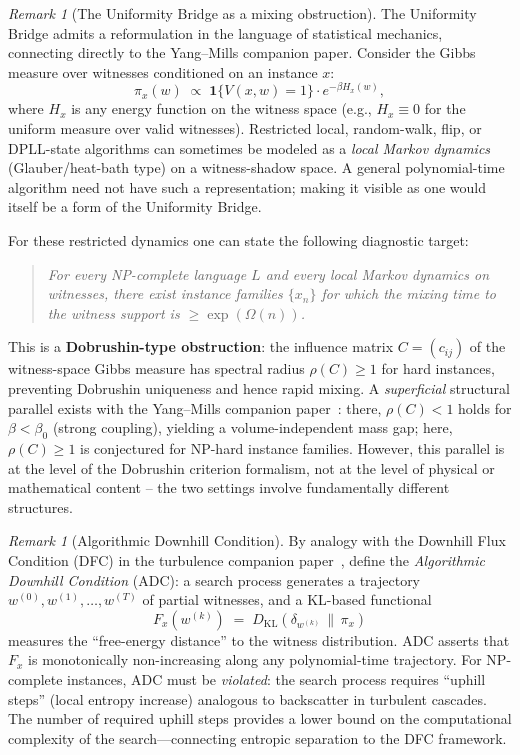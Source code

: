 \documentclass[aps,prd,twocolumn,superscriptaddress,nofootinbib]{revtex4-2}
\theoremstyle{definition}
\theoremstyle{remark}
\newtheorem{remark}[theorem]{Remark}
\begin{document}
\begin{remark}[The Uniformity Bridge as a mixing obstruction]
\label{rem:mixing-obstruction}
The Uniformity Bridge admits a reformulation in the language of statistical mechanics, connecting directly to the Yang--Mills companion paper. Consider the Gibbs measure over witnesses conditioned on an instance $x$:
\[
\pi_x(w) \;\propto\; \mathbf{1}\{V(x,w) = 1\} \cdot e^{-\beta H_x(w)},
\]
where $H_x$ is any energy function on the witness space (e.g., $H_x \equiv 0$ for the uniform measure over valid witnesses). Restricted local, random-walk, flip, or DPLL-state algorithms can sometimes be modeled as a \emph{local Markov dynamics} (Glauber/heat-bath type) on a witness-shadow space. A general polynomial-time algorithm need not have such a representation; making it visible as one would itself be a form of the Uniformity Bridge.

For these restricted dynamics one can state the following diagnostic target:
\begin{quote}
\emph{For every NP-complete language $L$ and every local Markov dynamics on witnesses, there exist instance families $\{x_n\}$ for which the mixing time to the witness support is $\geq \exp(\Omega(n))$.}
\end{quote}
This is a \textbf{Dobrushin-type obstruction}: the influence matrix $C = (c_{ij})$ of the witness-space Gibbs measure has spectral radius $\rho(C) \geq 1$ for hard instances, preventing Dobrushin uniqueness and hence rapid mixing. A \emph{superficial} structural parallel exists with the Yang--Mills companion paper~\cite{Geiger2026-YM}: there, $\rho(C) < 1$ holds for $\beta < \beta_0$ (strong coupling), yielding a volume-independent mass gap; here, $\rho(C) \geq 1$ is conjectured for NP-hard instance families. However, this parallel is at the level of the Dobrushin criterion formalism, not at the level of physical or mathematical content -- the two settings involve fundamentally different structures.
\end{remark}

\begin{remark}[Algorithmic Downhill Condition]
\label{rem:algorithmic-downhill}
By analogy with the Downhill Flux Condition (DFC) in the turbulence companion paper~\cite{Geiger2026-TU}, define the \emph{Algorithmic Downhill Condition} (ADC): a search process generates a trajectory $w^{(0)}, w^{(1)}, \ldots, w^{(T)}$ of partial witnesses, and a KL-based functional
\[
F_x(w^{(k)}) \;=\; D_{\mathrm{KL}}\!\left(\delta_{w^{(k)}} \,\|\, \pi_x\right)
\]
measures the ``free-energy distance'' to the witness distribution. ADC asserts that $F_x$ is monotonically non-increasing along any polynomial-time trajectory. For NP-complete instances, ADC must be \emph{violated}: the search process requires ``uphill steps'' (local entropy increase) analogous to backscatter in turbulent cascades. The number of required uphill steps provides a lower bound on the computational complexity of the search---connecting entropic separation to the DFC framework.
\end{remark}
\end{document}
